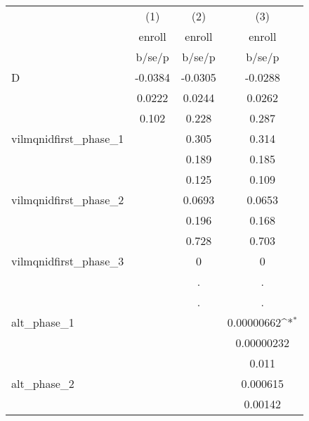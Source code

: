 {
\def\sym#1{\ifmmode^{#1}\else\(^{#1}\)\fi}
\begin{tabular}{l*{3}{c}}
\hline\hline
            &\multicolumn{1}{c}{(1)}&\multicolumn{1}{c}{(2)}&\multicolumn{1}{c}{(3)}\\
            &\multicolumn{1}{c}{enroll}&\multicolumn{1}{c}{enroll}&\multicolumn{1}{c}{enroll}\\
            &      b/se/p         &      b/se/p         &      b/se/p         \\
\hline
D           &     -0.0384         &     -0.0305         &     -0.0288         \\
            &      0.0222         &      0.0244         &      0.0262         \\
            &       0.102         &       0.228         &       0.287         \\
vilmqnidfirst\_phase\_1&                     &       0.305         &       0.314         \\
            &                     &       0.189         &       0.185         \\
            &                     &       0.125         &       0.109         \\
vilmqnidfirst\_phase\_2&                     &      0.0693         &      0.0653         \\
            &                     &       0.196         &       0.168         \\
            &                     &       0.728         &       0.703         \\
vilmqnidfirst\_phase\_3&                     &           0         &           0         \\
            &                     &           .         &           .         \\
            &                     &           .         &           .         \\
alt\_phase\_1 &                     &                     &  0.00000662\sym{*}  \\
            &                     &                     &  0.00000232         \\
            &                     &                     &       0.011         \\
alt\_phase\_2 &                     &                     &    0.000615         \\
            &                     &                     &     0.00142         \\

\end{tabular}}
